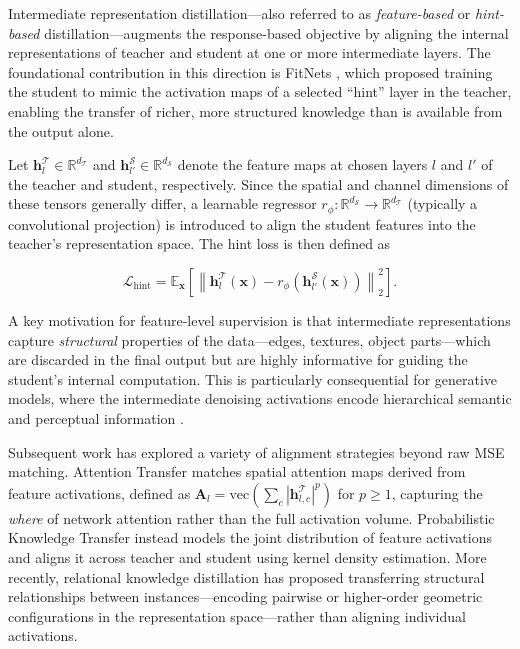 Intermediate representation distillation—also referred to as \emph{feature-based} or
\emph{hint-based} distillation—augments the response-based objective by aligning the internal
representations of teacher and student at one or more intermediate layers.
The foundational contribution in this direction is FitNets \cite{romero2015fitnets}, which proposed
training the student to mimic the activation maps of a selected ``hint'' layer in the teacher,
enabling the transfer of richer, more structured knowledge than is available from the output alone.

Let $\mathbf{h}^{\mathcal{T}}_l \in \mathbb{R}^{d_{\mathcal{T}}}$ and
$\mathbf{h}^{\mathcal{S}}_{l'} \in \mathbb{R}^{d_{\mathcal{S}}}$ denote the feature maps at chosen
layers $l$ and $l'$ of the teacher and student, respectively.
Since the spatial and channel dimensions of these tensors generally differ, a learnable regressor
$r_\phi: \mathbb{R}^{d_{\mathcal{S}}} \to \mathbb{R}^{d_{\mathcal{T}}}$ (typically a convolutional
projection) is introduced to align the student features into the teacher's representation space.
The hint loss is then defined as

\begin{equation}
    \mathcal{L}_{\mathrm{hint}} = \mathbb{E}_{\mathbf{x}}\!\left[\left\| \mathbf{h}^{\mathcal{T}}_l(\mathbf{x}) - r_\phi\!\left(\mathbf{h}^{\mathcal{S}}_{l'}(\mathbf{x})\right) \right\|_2^2\right].
    \label{eq:hint_loss}
\end{equation}

A key motivation for feature-level supervision is that intermediate representations capture
\emph{structural} properties of the data—edges, textures, object parts—which are discarded in the
final output but are highly informative for guiding the student's internal computation.
This is particularly consequential for generative models, where the intermediate denoising activations
encode hierarchical semantic and perceptual information \cite{romero2015fitnets, zagoruyko2017paying}.

Subsequent work has explored a variety of alignment strategies beyond raw MSE matching.
Attention Transfer \cite{zagoruyko2017paying} matches spatial attention maps derived from feature
activations, defined as $\mathbf{A}_l = \text{vec}\!\left(\sum_c |\mathbf{h}^{\mathcal{T}}_{l,c}|^p\right)$
for $p \geq 1$, capturing the \emph{where} of network attention rather than the full activation volume.
Probabilistic Knowledge Transfer instead models the joint distribution of
feature activations and aligns it across teacher and student using kernel density estimation.
More recently, relational knowledge distillation \cite{park2019relational} has proposed transferring
structural relationships between instances—encoding pairwise or higher-order geometric configurations in
the representation space—rather than aligning individual activations.

